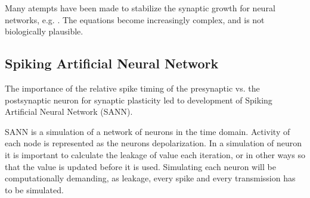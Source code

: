 	Many atempts have been made to stabilize the synaptic growth for neural networks, e.g. \cite{hebbUstabilt}. %
	The equations become increasingly complex, and is not biologically plausible.


\subsection{Spiking Artificial Neural Network}
The importance of the relative spike timing of the presynaptic vs. the postsynaptic neuron for synaptic plasticity led to development of Spiking Artificial Neural Network (SANN). 

SANN is a simulation of a network of neurons in the time domain. Activity of each node is represented as the neurons depolarization. 
In a simulation of neuron it is important to calculate the leakage of value each iteration, or in other ways so that the value is updated before it is used. 
Simulating each neuron will be computationally demanding, as leakage, every spike and every transmission has to be simulated. %

